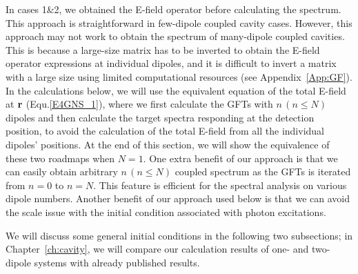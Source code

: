 In cases 1\&2, we obtained the E-field operator before calculating the spectrum. This approach is straightforward in few-dipole coupled cavity cases. However, this approach may not work to obtain the spectrum of many-dipole coupled cavities. This is because a large-size matrix has to be inverted to obtain the E-field operator expressions at individual dipoles, and it is difficult to invert a matrix with a large size using limited computational resources (see Appendix~\ref{App:GF}). In the calculations below, we will use the equivalent equation of the total E-field at $\mathbf{r}$ (Equ.\eqref{E4GNS_1}), where we first calculate the GFTs with $n\,(n\leq N)$ dipoles and then calculate the target spectra responding at the detection position, to avoid the calculation of the total E-field from all the individual dipoles' positions.  At the end of this section, we will show the equivalence of these two roadmaps when $N=1$. One extra benefit of our approach is that we can easily obtain arbitrary $n\,(n\leq N)$ coupled spectrum as the GFTs is iterated from $n=0$ to $n=N$. This feature is efficient for the spectral analysis on various dipole numbers. Another benefit of our approach used below is that we can avoid the scale issue with the initial condition associated with photon excitations.

We will discuss some general initial conditions in the following two subsections; in Chapter~\ref{ch:cavity}, we will compare our calculation results of one- and two-dipole systems with already published results.



%
%

